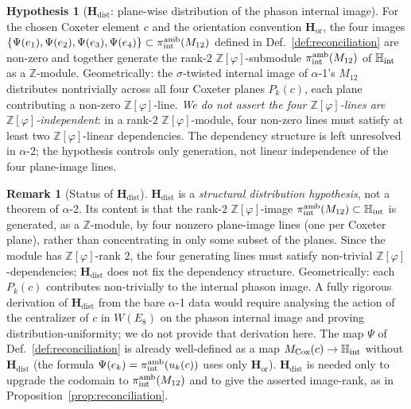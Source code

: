 \documentclass[11pt, a4paper]{amsart}
\theoremstyle{definition}
\newtheorem{remark}[theorem]{Remark}
\newtheorem{hypothesis}[theorem]{Hypothesis}
\newcommand{\Z}{\mathbb{Z}}
\newcommand{\HH}{\mathbb{H}}
\newcommand{\Hor}{\mathbf{H}_{\mathrm{or}}}
\newcommand{\Hdist}{\mathbf{H}_{\mathrm{dist}}}
\newcommand{\Ophi}{\mathbb{Z}[\varphi]}
\newcommand{\Mcox}{M_{\mathrm{Cox}}}
\newcommand{\Mtw}{M_{12}}
\begin{document}
\begin{hypothesis}[$\Hdist$: plane-wise distribution of the
  phason internal image]
\label{hyp:Hdist}
For the chosen Coxeter element $c$ and the orientation
convention $\Hor$, the four images $\{\Psi(e_1), \Psi(e_2),
\Psi(e_3), \Psi(e_4)\} \subset \pi_{\rm int}^{\rm
amb}(\Mtw)$ defined in Def.~\ref{def:reconciliation} are
non-zero and together generate the rank-$2$ $\Ophi$-submodule
$\pi_{\rm int}^{\rm amb}(\Mtw)$ of $\HH_{\rm int}$ as a
$\Z$-module. Geometrically: the $\sigma$-twisted internal
image of $\alpha$-1's $\Mtw$ distributes nontrivially across
all four Coxeter planes $P_k(c)$, each plane contributing a
non-zero $\Ophi$-line. \emph{We do not assert the four
$\Ophi$-lines are $\Ophi$-independent}: in a rank-$2$
$\Ophi$-module, four non-zero lines must satisfy at least two
$\Ophi$-linear dependencies. The dependency structure is left
unresolved in $\alpha$-2; the hypothesis controls only
generation, not linear independence of the four plane-image
lines.
\end{hypothesis}

\begin{remark}[Status of $\Hdist$]
\label{rmk:Hdist-status}
$\Hdist$ is a \emph{structural distribution hypothesis},
not a theorem of $\alpha$-2. Its content is that the
rank-$2$ $\Ophi$-image $\pi_{\rm int}^{\rm amb}(\Mtw)
\subset \HH_{\rm int}$ is generated, as a $\Z$-module, by four
nonzero plane-image lines (one per Coxeter plane), rather than
concentrating in only some subset of the planes. Since the
module has $\Ophi$-rank $2$, the four generating lines must
satisfy non-trivial $\Ophi$-dependencies; $\Hdist$ does not
fix the dependency structure. Geometrically: each $P_k(c)$ contributes
non-trivially to the internal phason image. A fully rigorous
derivation of $\Hdist$ from the bare $\alpha$-1 data would
require analysing the action of the centralizer of $c$ in
$W(E_8)$ on the phason internal image and proving
distribution-uniformity; we do not provide that derivation
here. The map $\Psi$ of Def.~\ref{def:reconciliation} is
already well-defined as a map $\Mcox(c) \to \HH_{\rm int}$
without $\Hdist$ (the formula $\Psi(e_k) = \pi_{\rm
int}^{\rm amb}(u_k(c))$ uses only $\Hor$). $\Hdist$ is
needed only to upgrade the codomain to $\pi_{\rm int}^{\rm
amb}(\Mtw)$ and to give the asserted image-rank, as in
Proposition~\ref{prop:reconciliation}.
\end{remark}
\end{document}
